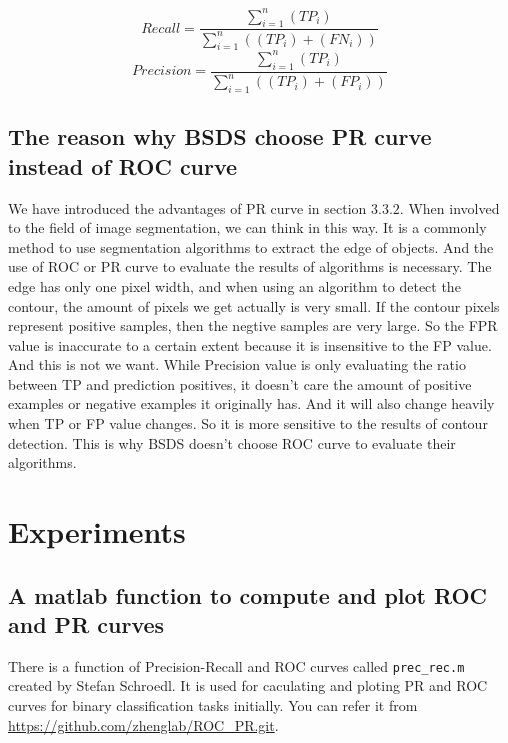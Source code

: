 \documentclass[a4paper,12pt]{article}
\begin{document}
\begin{equation}\label{eq:whole_Recall}
Recall=\frac{\displaystyle\sum_{i=1}^n(TP_i)}{\displaystyle\sum_{i=1}^n((TP_i)+(FN_i))}
\end{equation}
\begin{equation}\label{eq:whole_Precision}
Precision=\frac{\displaystyle\sum_{i=1}^n(TP_i)}{\displaystyle\sum_{i=1}^n((TP_i)+(FP_i))}
\end{equation}

\subsection{The reason why BSDS choose PR curve instead of ROC curve}

We have introduced the advantages of PR curve in section $3.3.2$. When involved to the field of image segmentation, we can think in this way. It is a commonly method to use segmentation algorithms to extract the edge of objects. And the use of ROC or PR curve to evaluate the results of algorithms is necessary. The edge has only one pixel width, and when using an algorithm to detect the contour, the amount of pixels we get actually is very small. If the contour pixels represent positive samples, then the negtive samples are very large. So the FPR value is inaccurate to a certain extent because it is insensitive to the FP value. And this is not we want. While Precision value is only evaluating the ratio between TP and prediction positives, it doesn't care the amount of positive examples or negative examples it originally has. And it will also change heavily when TP or FP value changes. So it is more sensitive to the results of contour detection. This is why BSDS doesn't choose ROC curve to evaluate their algorithms\cite{6:misc}.  



\section{Experiments}

\subsection{A matlab function to compute and plot ROC and PR curves}

There is a function of Precision-Recall and ROC curves called \verb|prec_rec.m| created by Stefan Schroedl. It is used for caculating and ploting PR and ROC curves for binary classification tasks initially.
You can refer it from \url{https://github.com/zhenglab/ROC\_PR.git}.
\end{document}
